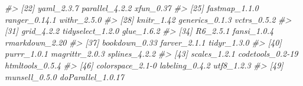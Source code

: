 \documentclass[
]{article}
\newenvironment{Shaded}{\begin{snugshade}}{\end{snugshade}}
\newcommand{\CommentTok}[1]{\textcolor[rgb]{0.56,0.35,0.01}{\textit{#1}}}
\begin{document}
\begin{Shaded}
\begin{Highlighting}[]
\CommentTok{\#\textgreater{} [22] yaml\_2.3.7        parallel\_4.2.2    xfun\_0.37        }
\CommentTok{\#\textgreater{} [25] fastmap\_1.1.0     ranger\_0.14.1     withr\_2.5.0      }
\CommentTok{\#\textgreater{} [28] knitr\_1.42        generics\_0.1.3    vctrs\_0.5.2      }
\CommentTok{\#\textgreater{} [31] grid\_4.2.2        tidyselect\_1.2.0  glue\_1.6.2       }
\CommentTok{\#\textgreater{} [34] R6\_2.5.1          fansi\_1.0.4       rmarkdown\_2.20   }
\CommentTok{\#\textgreater{} [37] bookdown\_0.33     farver\_2.1.1      tidyr\_1.3.0      }
\CommentTok{\#\textgreater{} [40] purrr\_1.0.1       magrittr\_2.0.3    splines\_4.2.2    }
\CommentTok{\#\textgreater{} [43] scales\_1.2.1      codetools\_0.2{-}19  htmltools\_0.5.4  }
\CommentTok{\#\textgreater{} [46] colorspace\_2.1{-}0  labeling\_0.4.2    utf8\_1.2.3       }
\CommentTok{\#\textgreater{} [49] munsell\_0.5.0     doParallel\_1.0.17}
\end{Highlighting}
\end{Shaded}


  
\end{document}
